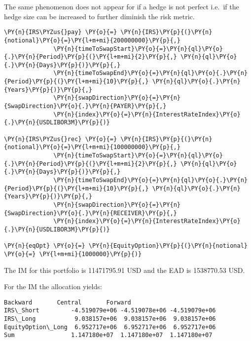     The same phenomenon does not appear for if a hedge is not perfect
i.e.~if the hedge size can be increased to further diminish the risk
metric.

    \begin{tcolorbox}[breakable, size=fbox, boxrule=1pt, pad at break*=1mm,colback=cellbackground, colframe=cellborder]
\begin{Verbatim}[commandchars=\\\{\}]
\PY{n}{IRS\PYZus{}pay} \PY{o}{=} \PY{n}{IRS}\PY{p}{(}\PY{n}{notional}\PY{o}{=}\PY{l+m+mi}{200000000}\PY{p}{,}
              \PY{n}{timeToSwapStart}\PY{o}{=}\PY{n}{ql}\PY{o}{.}\PY{n}{Period}\PY{p}{(}\PY{l+m+mi}{2}\PY{p}{,} \PY{n}{ql}\PY{o}{.}\PY{n}{Days}\PY{p}{)}\PY{p}{,}
              \PY{n}{timeToSwapEnd}\PY{o}{=}\PY{n}{ql}\PY{o}{.}\PY{n}{Period}\PY{p}{(}\PY{l+m+mi}{10}\PY{p}{,} \PY{n}{ql}\PY{o}{.}\PY{n}{Years}\PY{p}{)}\PY{p}{,}
              \PY{n}{swapDirection}\PY{o}{=}\PY{n}{SwapDirection}\PY{o}{.}\PY{n}{PAYER}\PY{p}{,}
              \PY{n}{index}\PY{o}{=}\PY{n}{InterestRateIndex}\PY{o}{.}\PY{n}{USDLIBOR3M}\PY{p}{)}

\PY{n}{IRS\PYZus{}rec} \PY{o}{=} \PY{n}{IRS}\PY{p}{(}\PY{n}{notional}\PY{o}{=}\PY{l+m+mi}{100000000}\PY{p}{,}
              \PY{n}{timeToSwapStart}\PY{o}{=}\PY{n}{ql}\PY{o}{.}\PY{n}{Period}\PY{p}{(}\PY{l+m+mi}{2}\PY{p}{,} \PY{n}{ql}\PY{o}{.}\PY{n}{Days}\PY{p}{)}\PY{p}{,}
              \PY{n}{timeToSwapEnd}\PY{o}{=}\PY{n}{ql}\PY{o}{.}\PY{n}{Period}\PY{p}{(}\PY{l+m+mi}{10}\PY{p}{,} \PY{n}{ql}\PY{o}{.}\PY{n}{Years}\PY{p}{)}\PY{p}{,}
              \PY{n}{swapDirection}\PY{o}{=}\PY{n}{SwapDirection}\PY{o}{.}\PY{n}{RECEIVER}\PY{p}{,}
              \PY{n}{index}\PY{o}{=}\PY{n}{InterestRateIndex}\PY{o}{.}\PY{n}{USDLIBOR3M}\PY{p}{)}

\PY{n}{eqOpt} \PY{o}{=} \PY{n}{EquityOption}\PY{p}{(}\PY{n}{notional} \PY{o}{=} \PY{l+m+mi}{1000000}\PY{p}{)}
\end{Verbatim}
\end{tcolorbox}

    The IM for this portfolio is 11471795.91 USD and the EAD is 1538770.53
USD.

    
    For the IM the allocation yields:

            \begin{tcolorbox}[breakable, size=fbox, boxrule=.5pt, pad at break*=1mm, opacityfill=0]
\begin{Verbatim}[commandchars=\\\{\}]
                       Backward       Central       Forward
IRS\_Short         -4.519079e+06 -4.519078e+06 -4.519079e+06
IRS\_Long           9.038157e+06  9.038157e+06  9.038157e+06
EquityOption\_Long  6.952717e+06  6.952717e+06  6.952717e+06
Sum                1.147180e+07  1.147180e+07  1.147180e+07
\end{Verbatim}
\end{tcolorbox}
        
